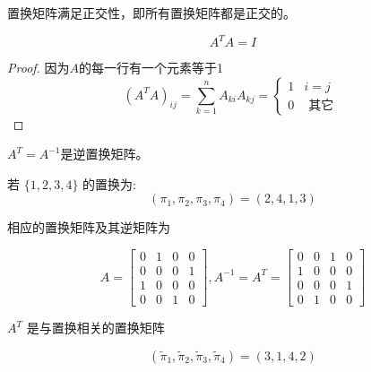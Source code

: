 \begin{theorem}
    置换矩阵满足正交性，即所有置换矩阵都是正交的。
\end{theorem}

\begin{corollary}
    \begin{equation} A^{T} A=I \end{equation}
\end{corollary}

\begin{proof}
    因为$A$的每一行有一个元素等于1
\begin{equation}
\left(A^{T} A\right)_{i j}=\sum_{k=1}^{n} A_{k i} A_{k j}=\left\{\begin{array}{ll}
1 & i=j \\
0 & \text { 其它 }
\end{array}\right.
\end{equation}
\end{proof}

\begin{corollary}
    $ A^{T}=A^{-1} $是逆置换矩阵。
\end{corollary}

\begin{example}
    若 $ \{1,2,3,4\} $ 的置换为:
\begin{equation}
\left(\pi_{1}, \pi_{2}, \pi_{3}, \pi_{4}\right)=(2,4,1,3)
\end{equation}

相应的置换矩阵及其逆矩阵为

\begin{equation} A=\left[\begin{array}{llll}0 & 1 & 0 & 0 \\ 0 & 0 & 0 & 1 \\ 1 & 0 & 0 & 0 \\ 0 & 0 & 1 & 0\end{array}\right] , A^{-1}=A^{T}=\left[\begin{array}{llll}0 & 0 & 1 & 0 \\ 1 & 0 & 0 & 0 \\ 0 & 0 & 0 & 1 \\ 0 & 1 & 0 & 0\end{array}\right] \end{equation}

$ A^{T} $ 是与置换相关的置换矩阵

\begin{equation}
\left(\tilde{\pi}_{1}, \tilde{\pi}_{2}, \tilde{\pi}_{3}, \tilde{\pi}_{4}\right)=(3,1,4,2)
\end{equation}
\end{example}

